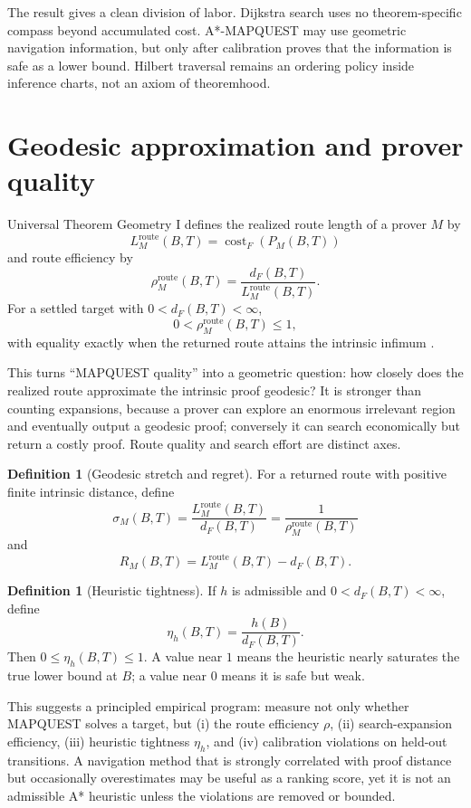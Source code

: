 \documentclass[11pt]{article}
\theoremstyle{definition}
\newtheorem{definition}[theorem]{Definition}
\theoremstyle{remark}
\newcommand{\cost}{\operatorname{cost}}
\newcommand{\route}{\mathrm{route}}
\begin{document}
The result gives a clean division of labor. Dijkstra search uses no theorem-specific compass beyond accumulated cost. A*-MAPQUEST may use geometric navigation information, but only after calibration proves that the information is safe as a lower bound. Hilbert traversal remains an ordering policy inside inference charts, not an axiom of theoremhood.

\section{Geodesic approximation and prover quality}

Universal Theorem Geometry I defines the realized route length of a prover $M$ by
\[
L_M^{\route}(B,T)=\cost_F(P_M(B,T))
\]
and route efficiency by
\[
\rho_M^{\route}(B,T)
=
\frac{d_F(B,T)}{L_M^{\route}(B,T)}.
\]
For a settled target with $0<d_F(B,T)<\infty$,
\[
0<\rho_M^{\route}(B,T)\le1,
\]
with equality exactly when the returned route attains the intrinsic infimum \cite{UTGI}.

This turns ``MAPQUEST quality'' into a geometric question: how closely does the realized route approximate the intrinsic proof geodesic? It is stronger than counting expansions, because a prover can explore an enormous irrelevant region and eventually output a geodesic proof; conversely it can search economically but return a costly proof. Route quality and search effort are distinct axes.

\begin{definition}[Geodesic stretch and regret]
For a returned route with positive finite intrinsic distance, define
\[
\sigma_M(B,T)=\frac{L_M^{\route}(B,T)}{d_F(B,T)}
=\frac{1}{\rho_M^{\route}(B,T)}
\]
and
\[
R_M(B,T)=L_M^{\route}(B,T)-d_F(B,T).
\]
\end{definition}

\begin{definition}[Heuristic tightness]
If $h$ is admissible and $0<d_F(B,T)<\infty$, define
\[
\eta_h(B,T)=\frac{h(B)}{d_F(B,T)}.
\]
Then $0\le\eta_h(B,T)\le1$. A value near $1$ means the heuristic nearly saturates the true lower bound at $B$; a value near $0$ means it is safe but weak.
\end{definition}

This suggests a principled empirical program: measure not only whether MAPQUEST solves a target, but (i) the route efficiency $\rho$, (ii) search-expansion efficiency, (iii) heuristic tightness $\eta_h$, and (iv) calibration violations on held-out transitions. A navigation method that is strongly correlated with proof distance but occasionally overestimates may be useful as a ranking score, yet it is not an admissible A* heuristic unless the violations are removed or bounded.
\end{document}
